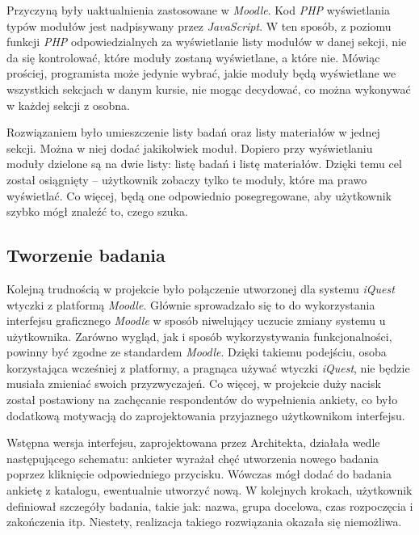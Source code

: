 Przyczyną były uaktualnienia zastosowane w \textit{Moodle}. Kod \textit{PHP} wyświetlania typów modułów jest nadpisywany przez \textit{JavaScript}. W ten sposób, z poziomu funkcji \textit{PHP} odpowiedzialnych za wyświetlanie listy modułów w danej sekcji, nie da się kontrolować, które moduły zostaną wyświetlane, a które nie. Mówiąc prościej, programista może jedynie wybrać, jakie moduły będą wyświetlane we wszystkich sekcjach w danym kursie, nie mogąc decydować, co można wykonywać w każdej sekcji z osobna.

Rozwiązaniem było umieszczenie listy badań oraz listy materiałów w jednej sekcji. Można w niej dodać jakikolwiek moduł. Dopiero przy wyświetlaniu moduły dzielone są na dwie listy: listę badań i listę materiałów. Dzięki temu cel został osiągnięty -- użytkownik zobaczy tylko te moduły, które ma prawo wyświetlać. Co więcej, będą one odpowiednio posegregowane, aby użytkownik szybko mógł znaleźć to, czego szuka.

\subsection{Tworzenie badania}
\label{Chapter628}

Kolejną trudnością w projekcie było połączenie utworzonej dla systemu \textit{iQuest} wtyczki z platformą \textit{Moodle}. Głównie sprowadzało się to do wykorzystania interfejsu graficznego \textit{Moodle} w sposób niwelujący uczucie zmiany systemu u użytkownika. Zarówno wygląd, jak i sposób wykorzystywania funkcjonalności, powinny być zgodne ze standardem \textit{Moodle}. Dzięki takiemu podejściu, osoba korzystająca wcześniej z platformy, a pragnąca używać wtyczki \textit{iQuest}, nie będzie musiała zmieniać swoich przyzwyczajeń. Co więcej, w projekcie duży nacisk został postawiony na zachęcanie respondentów do wypełnienia ankiety, co było dodatkową motywacją do zaprojektowania przyjaznego użytkownikom interfejsu.

Wstępna wersja interfejsu, zaprojektowana przez Architekta, działała wedle następującego schematu: ankieter wyrażał chęć utworzenia nowego badania poprzez kliknięcie odpowiedniego przycisku. Wówczas mógł dodać do badania ankietę z katalogu, ewentualnie utworzyć nową. W kolejnych krokach, użytkownik definiował szczegóły badania, takie jak: nazwa, grupa docelowa, czas rozpoczęcia i zakończenia itp. Niestety, realizacja takiego rozwiązania okazała się niemożliwa.

